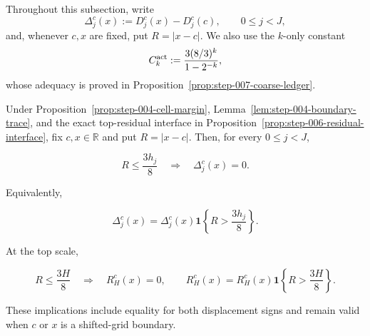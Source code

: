 Throughout this subsection, write
\[
\Delta_j^c(x):=D_j^c(x)-D_j^c(c),
\qquad 0\leq j<J,
\]
and, whenever \(c,x\) are fixed, put \(R=|x-c|\).  We also use the
\(k\)-only constant
\[
C_k^{\rm act}:=\frac{3(8/3)^k}{1-2^{-k}},
\]
whose adequacy is proved in Proposition~\ref{prop:step-007-coarse-ledger}.

\begin{lemma}\label{lem:step-007-stable-support}
Under Proposition~\ref{prop:step-004-cell-margin}, Lemma~\ref{lem:step-004-boundary-trace}, and the exact top-residual interface in Proposition~\ref{prop:step-006-residual-interface}, fix \(c,x\in\mathbb R\) and put \(R=|x-c|\). Then, for every \(0\leq j<J\),

\[
R\leq\frac{3h_j}{8}
\quad\Longrightarrow\quad
\Delta_j^c(x)=0.
\]

Equivalently,

\[
\Delta_j^c(x)
=\Delta_j^c(x)\mathbf 1\!\left\{R>\frac{3h_j}{8}\right\}.
\]

At the top scale,

\[
R\leq\frac{3H}{8}
\quad\Longrightarrow\quad
R_H^c(x)=0,
\qquad
R_H^c(x)
=R_H^c(x)\mathbf 1\!\left\{R>\frac{3H}{8}\right\}.
\]

These implications include equality for both displacement signs and remain valid when \(c\) or \(x\) is a shifted-grid boundary.
\end{lemma}

